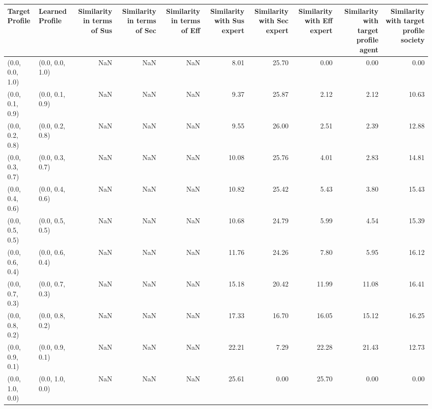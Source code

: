 \begin{tabular}{llrrrrrrrr}
\toprule
Target Profile & Learned Profile & Similarity in terms of Sus & Similarity in terms of Sec & Similarity in terms of Eff & Similarity with Sus expert & Similarity with Sec expert & Similarity with Eff expert & Similarity with target profile agent & Similarity with target profile society \\
\midrule
(0.0, 0.0, 1.0) & (0.0, 0.0, 1.0) & NaN & NaN & NaN & 8.01 & 25.70 & 0.00 & 0.00 & 0.00 \\
(0.0, 0.1, 0.9) & (0.0, 0.1, 0.9) & NaN & NaN & NaN & 9.37 & 25.87 & 2.12 & 2.12 & 10.63 \\
(0.0, 0.2, 0.8) & (0.0, 0.2, 0.8) & NaN & NaN & NaN & 9.55 & 26.00 & 2.51 & 2.39 & 12.88 \\
(0.0, 0.3, 0.7) & (0.0, 0.3, 0.7) & NaN & NaN & NaN & 10.08 & 25.76 & 4.01 & 2.83 & 14.81 \\
(0.0, 0.4, 0.6) & (0.0, 0.4, 0.6) & NaN & NaN & NaN & 10.82 & 25.42 & 5.43 & 3.80 & 15.43 \\
(0.0, 0.5, 0.5) & (0.0, 0.5, 0.5) & NaN & NaN & NaN & 10.68 & 24.79 & 5.99 & 4.54 & 15.39 \\
(0.0, 0.6, 0.4) & (0.0, 0.6, 0.4) & NaN & NaN & NaN & 11.76 & 24.26 & 7.80 & 5.95 & 16.12 \\
(0.0, 0.7, 0.3) & (0.0, 0.7, 0.3) & NaN & NaN & NaN & 15.18 & 20.42 & 11.99 & 11.08 & 16.41 \\
(0.0, 0.8, 0.2) & (0.0, 0.8, 0.2) & NaN & NaN & NaN & 17.33 & 16.70 & 16.05 & 15.12 & 16.25 \\
(0.0, 0.9, 0.1) & (0.0, 0.9, 0.1) & NaN & NaN & NaN & 22.21 & 7.29 & 22.28 & 21.43 & 12.73 \\
(0.0, 1.0, 0.0) & (0.0, 1.0, 0.0) & NaN & NaN & NaN & 25.61 & 0.00 & 25.70 & 0.00 & 0.00 \\
\bottomrule
\end{tabular}
